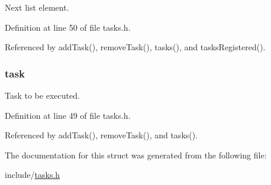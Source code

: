 Next list element. 



Definition at line 50 of file tasks.\-h.



Referenced by add\-Task(), remove\-Task(), tasks(), and tasks\-Registered().

\hypertarget{struct_task_element_a8bcc572b9d73774627be66dd46aa61a8}{
\subsubsection[{task}]{ task}}\label{struct_task_element_a8bcc572b9d73774627be66dd46aa61a8}


Task to be executed. 



Definition at line 49 of file tasks.\-h.



Referenced by add\-Task(), remove\-Task(), and tasks().



The documentation for this struct was generated from the following file\-:\begin{DoxyCompactItemize}
\item 
include/\hyperlink{tasks_8h}{tasks.\-h}\end{DoxyCompactItemize}
